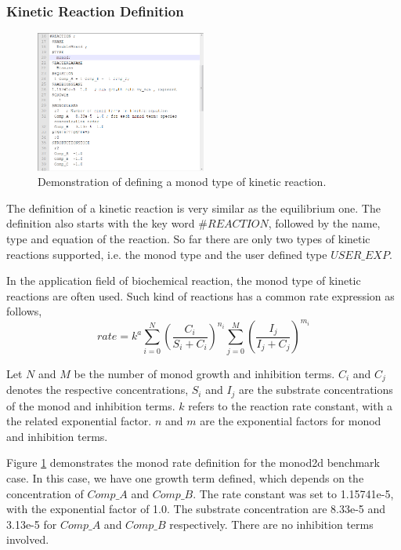 \subsubsection{Kinetic Reaction Definition}

\begin{figure}
\includegraphics[width=0.5\textwidth]{RT/figs/RT_fig_monod_eq}
\caption{Demonstration of defining a monod type of kinetic reaction. }
\label{fig:RT_fig_monod_eq}
\end{figure}

The definition of a kinetic reaction is very similar as the equilibrium one. The definition also starts with the key word $\#REACTION$, followed by the name, type and equation of the reaction. So far there are only two types of kinetic reactions supported, i.e. the monod type and the user defined type $USER\_EXP$. 

In the application field of biochemical reaction, the monod type of kinetic reactions are often used. Such kind of reactions has a common rate expression as follows, 
\begin{equation}
rate = k^a \sum_{i=0}^{N} \left( \frac{C_i}{S_i + C_i} \right)^{n_i} \sum_{j=0}^{M} \left( \frac{I_j}{I_j + C_j} \right)^{m_i} 
\end{equation}

Let $N$ and $M$ be the number of monod growth and inhibition terms. $C_i$ and $C_j$ denotes the respective concentrations, $S_i$ and $I_j$ are the substrate concentrations of the monod and inhibition terms. $k$ refers to the reaction rate constant, with a the related exponential factor. $n$ and $m$ are the exponential factors for monod and inhibition terms. 

Figure \ref{fig:RT_fig_monod_eq} demonstrates the monod rate definition for the monod2d benchmark case. In this case, we have one growth term defined, which depends on the concentration of $Comp\_A$ and $Comp\_B$. The rate constant was set to 1.15741e-5, with the exponential factor of 1.0. The substrate concentration are 8.33e-5 and 3.13e-5 for $Comp\_A$ and $Comp\_B$ respectively. There are no inhibition terms involved. 

